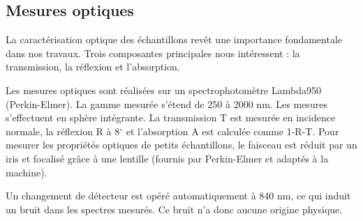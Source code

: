 	\subsection{Mesures optiques}
La caractérisation optique des échantillons revêt une importance fondamentale dans nos travaux. Trois composantes principales nous intéressent : la transmission, la réflexion et l'absorption.\par 
Les mesures optiques sont réalisées sur un spectrophotomètre Lambda950 (Perkin-Elmer). La gamme mesurée s'étend de 250 à 2000 nm. Les mesures s'effectuent en sphère intégrante. La transmission T est mesurée en incidence normale, la réflexion R à 8$^\circ$ et l'absorption A est calculée comme 1-R-T. Pour mesurer les propriétés optiques de petits échantillons, le faisceau est réduit par un iris et focalisé grâce à une lentille (fournis par Perkin-Elmer et adaptés à la machine).\par 
Un changement de détecteur est opéré automatiquement à 840 nm, ce qui induit un bruit dans les spectres mesurés. Ce bruit n'a donc aucune origine physique.\par 

